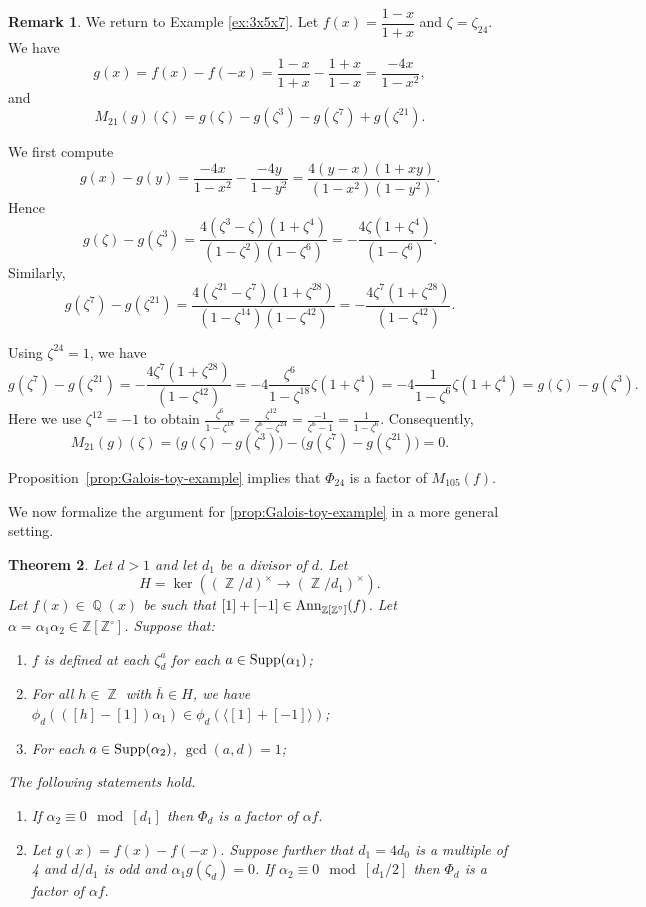 \documentclass[12t,a4paper]{amsart}
\newtheorem{thm}{Theorem}[section]
\theoremstyle{definition}
\newtheorem{rem}[thm]{Remark}
\DeclareMathOperator{\Z}{\mathbb{Z}}
\DeclareMathOperator{\Q}{\mathbb{Q}}
\DeclareMathOperator{\supp}{{\rm Supp}}
\newcommand{\Ann}{{\rm Ann}}
\numberwithin{equation}{section}
\begin{document}
{\begin{rem}
    We return to Example \ref{ex:3x5x7}. Let $f(x)=\dfrac{1-x}{1+x}$ and $\zeta=\zeta_{24}$.  We have
\[
g(x)=f(x)-f(-x)
=
\frac{1-x}{1+x}-\frac{1+x}{1-x}
=
\dfrac{-4x}{1-x^2},
\]
and
\[
M_{21}(g)(\zeta)
=
g(\zeta)-g(\zeta^3)-g(\zeta^7)+g(\zeta^{21}).
\]

We first compute
\[
g(x)-g(y)
=
\frac{-4x}{1-x^2}-\frac{-4y}{1-y^2}
=
\frac{4(y-x)(1+xy)}
{(1-x^2)(1-y^2)}.
\]
Hence
\[
g(\zeta)-g(\zeta^3)
=
\frac{4(\zeta^3-\zeta)(1+\zeta^4)}
{(1-\zeta^2)(1-\zeta^6)}= -\frac{4\zeta(1+\zeta^4)}
{(1-\zeta^6)}.
\]
Similarly,
\[
g(\zeta^7)-g(\zeta^{21})
=
\frac{4(\zeta^{21}-\zeta^7)(1+\zeta^{28})}
{(1-\zeta^{14})(1-\zeta^{42})}=-\frac{4\zeta^7(1+\zeta^{28})}
{(1-\zeta^{42})}.
\]

Using \(\zeta^{24}=1\), 
we have
\[
g(\zeta^7)-g(\zeta^{21})
=- \frac{4\zeta^7(1+\zeta^{28})}
{(1-\zeta^{42})} = -4\frac{\zeta^6}{1-\zeta^{18}} \zeta(1+\zeta^4)
=-4\frac{1}{1-\zeta^{6}} \zeta(1+\zeta^4)=
g(\zeta)-g(\zeta^3).
\]
Here we use $\zeta^{12}=-1$ to obtain $\frac{\zeta^6}{1-\zeta^{18}} =\frac{\zeta^{12}}{\zeta^6-\zeta^{24}}=\frac{-1}{\zeta^6-1}=\frac{1}{1-\zeta^6}$.
Consequently,
\[
M_{21}(g)(\zeta)
=
\bigl(g(\zeta)-g(\zeta^3)\bigr)
-
\bigl(g(\zeta^7)-g(\zeta^{21})\bigr)
=
0.
\]





Proposition~\ref{prop:Galois-toy-example} implies that $\Phi_{24}$ is a factor of $M_{105}(f)$.
\end{rem}

We now formalize the argument for \cref{prop:Galois-toy-example} in a more general setting. 
\begin{thm} 
\label{thm:Galois}
Let \(d>1\)  and let \(d_1\) be a divisor of \(d\). 
Let
\[
H=\ker( (\Z/d)^{\times} \to (\Z/d_1)^{\times} ).
\]
Let $f(x)\in \Q(x)$ be such that $[1]+[-1] \in \Ann_{\Z[\Z^{\circ}]}(f)$. 
  Let \(\alpha=\alpha_1\alpha_2\in \mathbb Z[\mathbb Z^\circ]\). Suppose that:

\begin{enumerate}
    \item $f$ is defined at each $\zeta_{d}^{a}$ for each $a \in \supp(\alpha_1)$;
    \item For all $h \in \Z$ with $\overline{h}\in H$, we have $\phi_{d}(([h]-[1])\alpha_{1}) \in \phi_d(\langle[1]+[-1]\rangle)$;
    \item For each $a \in \supp(\alpha_2)$, $\gcd(a,d)=1$;
 \end{enumerate}
The following statements hold.
\begin{enumerate} 
    \item[(a)]  If $\alpha_2 \equiv 0 \mod{[d_1]}$ then $\Phi_d$ is a factor of $\alpha f.$
    \item[(b)]  Let \( g(x)=f(x)-f(-x).\) Suppose further that $d_1=4d_0$ is a multiple of 4 and $d/d_1$ is odd and $\alpha_1g(\zeta_d)=0$. If  $\alpha_2 \equiv 0 \mod{[d_1/2]}$ then $\Phi_d$ is a factor of $\alpha f.$
\end{enumerate}
 

\end{thm}}
\end{document}
